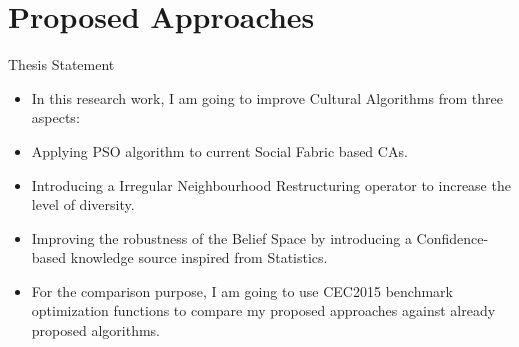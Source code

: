 \documentclass[table]{beamer}
\begin{document}
	\section{Proposed Approaches}
	
	\begin{frame}{Thesis Statement}
		\begin{block}{}
			\begin{itemize}
				\justifying			
				\item In this research work, I am going to improve Cultural Algorithms from three aspects:
				\item Applying PSO algorithm to current Social Fabric based CAs.
				\item Introducing a Irregular Neighbourhood Restructuring operator to increase the level of diversity.
				\item Improving the robustness of the Belief Space by introducing a Confidence-based knowledge source inspired from Statistics.
				\item For the comparison purpose, I am going to use CEC2015 benchmark optimization functions to compare my proposed approaches against already proposed algorithms.
			\end{itemize}
		\end{block}
	\end{frame}
		
	
\end{document}
